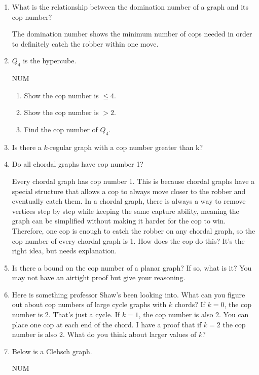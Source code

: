 \documentclass[11pt]{article}
\begin{document}
\begin{enumerate}[leftmargin=*]
    \item What is the relationship between the domination number of a graph and its cop number?
    \begin{solution}
        The domination number shows the minimum number of cops needed in order to definitely catch the robber within one move. 
    \end{solution}
    \item $Q_4$ is the hypercube. 
    \begin{graphfig}{NUM}
    \end{graphfig}
    \begin{enumerate}
        \item Show the cop number is $\leq 4$.
        \item Show the cop number is $>2$.
        \item Find the cop number of $Q_4$.
    \end{enumerate}
    \item Is there a $k$-regular graph with a cop number greater than k? 
    \item Do all chordal graphs have cop number 1?
    \begin{solution}
        Every chordal graph has cop number 1. This is because chordal graphs have a special structure that allows a cop to always move closer to the robber and eventually catch them. In a chordal graph, there is always a way to remove vertices step by step while keeping the same capture ability, meaning the graph can be simplified without making it harder for the cop to win. Therefore, one cop is enough to catch the robber on any chordal graph, so the cop number of every chordal graph is 1. \color{red}How does the cop do this? It's the right idea, but needs explanation.\color{black}
    \end{solution}
    \item Is there a bound on the cop number of a planar graph? If so, what is it? You may not have an airtight proof but give your reasoning. 
    \item Here is something professor Shaw's been looking into. What can you figure out about cop numbers of large cycle graphs with $k$ chords? If $k=0$, the cop number is 2. That's just a cycle. If $k=1$, the cop number is also 2. You can place one cop at each end of the chord. I have a proof that if $k=2$ the cop number is also 2. What do you think about larger values of $k$?
    \item Below is a Clebsch graph. 
    \begin{graphfig}{NUM}

\end{graphfig}
\end{enumerate}
\end{document}
